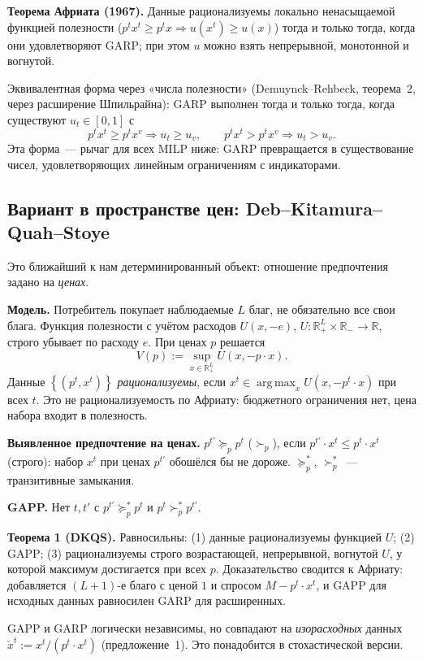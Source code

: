 \documentclass[a4paper,11pt]{article}
\theoremstyle{plain}
\theoremstyle{definition}
\theoremstyle{remark}
\newcommand{\R}{\mathbb{R}}
\newcommand{\set}[1]{\left\{ #1 \right\}}
\newcommand{\Rp}[1][2]{\R^{#1}_{+}}   %
\DeclareMathOperator*{\argmax}{arg\,max}
\begin{document}
\textbf{Теорема Африата (1967).} Данные рационализуемы локально ненасыщаемой функцией полезности ($p^tx^t\ge p^tx\Rightarrow u(x^t)\ge u(x)$) тогда и только тогда, когда они удовлетворяют GARP; при этом $u$ можно взять непрерывной, монотонной и вогнутой.

Эквивалентная форма через «числа полезности» (Demuynck--Rehbeck, теорема~2, через расширение Шпильрайна): GARP выполнен тогда и только тогда, когда существуют $u_t\in[0,1]$ с
\[
    p^tx^t\ge p^tx^v\Rightarrow u_t\ge u_v,\qquad p^tx^t>p^tx^v\Rightarrow u_t>u_v.
\]
Эта форма~--- рычаг для всех MILP ниже: GARP превращается в существование чисел, удовлетворяющих линейным ограничениям с индикаторами.

\subsection{Вариант в пространстве цен: Deb--Kitamura--Quah--Stoye}

Это ближайший к нам детерминированный объект: отношение предпочтения задано на \emph{ценах}.

\textbf{Модель.} Потребитель покупает наблюдаемые $L$ благ, не обязательно все свои блага. Функция полезности с учётом расходов $U(x,-e)$, $U:\Rp[L]\times\R_-\to\R$, строго убывает по расходу $e$. При ценах $p$ решается
\[
    V(p):=\sup_{x\in\Rp[L]}U(x,-p\cdot x).
\]
Данные $\set{(p^t,x^t)}$ \textit{рационализуемы}, если $x^t\in\argmax_xU(x,-p^t\cdot x)$ при всех $t$. Это не рационализуемость по Африату: бюджетного ограничения нет, цена набора входит в полезность.

\textbf{Выявленное предпочтение на ценах.} $p^{t'}\succeq_pp^t$ ($\succ_p$), если $p^{t'}\cdot x^t\le p^t\cdot x^t$ (строго): набор $x^t$ при ценах $p^{t'}$ обошёлся бы не дороже. $\succeq_p^*$, $\succ_p^*$~--- транзитивные замыкания.

\textbf{GAPP.} Нет $t,t'$ с $p^{t'}\succeq_p^*p^t$ и $p^t\succ_p^*p^{t'}$.

\textbf{Теорема 1 (DKQS).} Равносильны: (1) данные рационализуемы функцией $U$; (2) GAPP; (3) рационализуемы строго возрастающей, непрерывной, вогнутой $U$, у которой максимум достигается при всех $p$.
Доказательство сводится к Африату: добавляется $(L+1)$-е благо с ценой $1$ и спросом $M-p^t\cdot x^t$, и GAPP для исходных данных равносилен GARP для расширенных.

GAPP и GARP логически независимы, но совпадают на \textit{изорасходных} данных $\check x^t:=x^t/(p^t\cdot x^t)$ (предложение~1). Это понадобится в стохастической версии.
\end{document}
